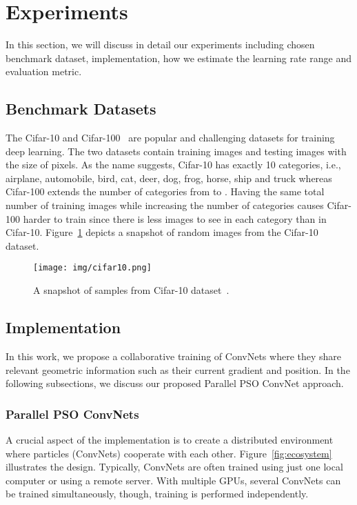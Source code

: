 \documentclass{ieeeaccess}
\begin{document}
\section{Experiments}
\label{sec:experiments}
In this section, we will discuss in detail our experiments including chosen benchmark dataset, implementation, how we estimate the learning rate range and evaluation metric.
\subsection{Benchmark Datasets}
The Cifar-10 and Cifar-100~\cite{krizhevsky2009learning} are popular and challenging datasets for training deep learning. The two datasets contain  training images and  testing images with the size of  pixels. As the name suggests, Cifar-10 has exactly 10 categories, i.e., airplane, automobile, bird, cat, deer, dog, frog, horse, ship and truck whereas Cifar-100 extends the number of categories from  to . Having the same total number of training images while increasing the number of categories causes Cifar-100 harder to train since there is less images to see in each category than in Cifar-10. Figure~\ref{fig:cifar10} depicts a snapshot of random images from the Cifar-10 dataset.
\begin{figure}[htb!]
\begin{center}
\texttt{[image: img/cifar10.png]}
\caption{A snapshot of samples from Cifar-10 dataset~\cite{krizhevsky2014cifar}.}
\label{fig:cifar10}
\end{center}
\end{figure}
\subsection{Implementation}
In this work, we propose a collaborative training of ConvNets where they share relevant geometric information such as their current gradient and position. In the following subsections, we discuss our proposed Parallel PSO ConvNet approach.
\subsubsection{Parallel PSO ConvNets}
A crucial aspect of the implementation is to create a distributed environment where particles (ConvNets) cooperate with each other. Figure~\ref{fig:ecosystem} illustrates the design. Typically, ConvNets are often trained using just one local computer or using a remote server. With multiple GPUs, several ConvNets can be trained simultaneously, though, training is performed independently.
\end{document}
